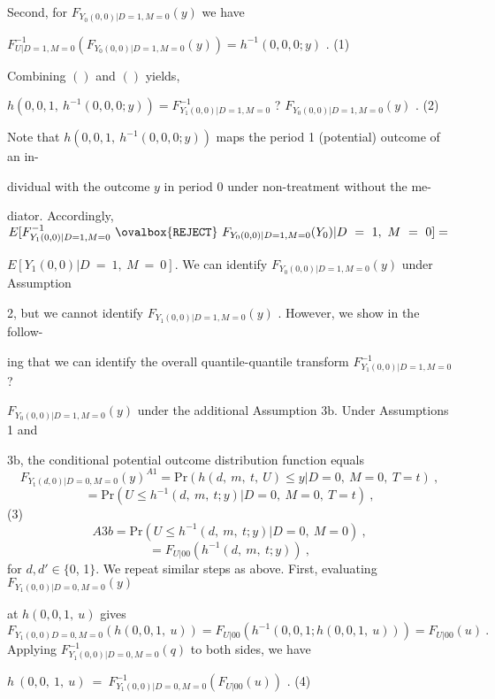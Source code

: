 \documentclass[a4paper,12pt]{article}
\begin{document}
Second, for $F_{Y_{0}(0,0)|D=1,M=0}(y)$ we have
\begin{center}
$F_{U|D=1,M=0}^{-1}(F_{Y_{0}(0,0)|D=1,M=0}(y))=h^{-1}(0,0,0;y)$ .   (1)
\end{center}
Combining $()$ and $()$ yields,
\begin{center}
$h(0,0,1,\ h^{-1}(0,0,0;y))=F_{Y_{1}(0,0)|D=1,M=0}^{-1}$ ? $F_{Y_{0}(0,0)|D=1,M=0}(y)$ .   (2)
\end{center}
Note that $h(0,0,1,\ h^{-1}(0,0,0;y))$ maps the period 1 (potential) outcome of an in-

dividual with the outcome $y$ in period $0$ under non-treatment without the me-

diator. Accordingly, $E[F_{Y_{1}(0,0)|D=1,M=0}^{-1}\ \ovalbox{\tt\small REJECT}\ F_{Y_{0}(0,0)|D=1,M=0}(Y_{0})|D\ =\ 1,\ M\ =\ 0] =$

$E[Y_{1}(0,0)|D\ =\ 1,\ M\ =\ 0]$. We can identify $F_{Y_{0}(0,0)|D=1,M=0}(y)$ under Assumption

2, but we cannot identify $F_{Y_{1}(0,0)|D=1,M=0}(y)$ . However, we show in the follow-

ing that we can identify the overall quantile-quantile transform $F_{Y_{1}(0,0)|D=1,M=0}^{-1}$ ?

$F_{Y_{0}(0,0)|D=1,M=0}(y)$ under the additional Assumption $3\mathrm{b}$. Under Assumptions 1 and

$3\mathrm{b}$, the conditional potential outcome distribution function equals
$$
F_{Y_{\mathrm{t}}(d,0)|D=0,M=0}(y)^{A1}=\mathrm{P}\mathrm{r}(h(d,\ m,\ t,\ U)\leq y|D=0,\ M=0,\ T=t)\ ,
$$
$$
=\mathrm{P}\mathrm{r}(U\leq h^{-1}(d,\ m,\ t;y)|D=0,\ M=0,\ T=t)\ ,
$$
(3)
$$
A3b=\mathrm{P}\mathrm{r}(U\leq h^{-1}(d,\ m,\ t;y)|D=0,\ M=0)\ ,
$$
$$
=F_{U|00}(h^{-1}(d,\ m,\ t;y))\ ,
$$
for $d, d'\in\{0$, 1$\}$. We repeat similar steps as above. First, evaluating $F_{Y_{1}(0,0)|D=0,M=0}(y)$

at $h(0,0,1,\ u)$ gives
$$
F_{Y_{1}(0,0)D=0,M=0}(h(0,0,1,\ u))=F_{U|00}(h^{-1}(0,0,1;h(0,0,1,\ u)))=F_{U|00}(u)\ .
$$
Applying $F_{Y_{1}(0,0)|D=0,M=0}^{-1}(q)$ to both sides, we have
\begin{center}
$h\ (0,0,\ 1,\ u)\ =\ F_{Y_{1}(0,0)|D=0,M=0}^{-1}(F_{U|00}(u))$ .   (4)
\end{center}
\end{document}
